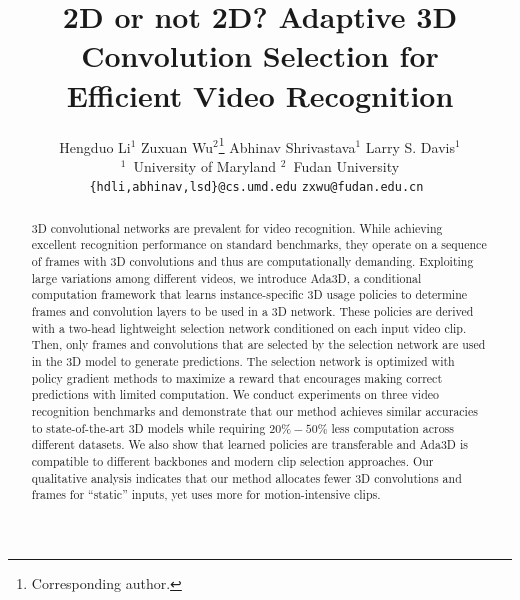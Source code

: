 \documentclass[final]{cvpr}
\begin{document}
\title{2D or not 2D? Adaptive 3D Convolution Selection for \\ Efficient Video Recognition}

\author{Hengduo Li$^{1}$ \qquad Zuxuan Wu$^{2}$\thanks{Corresponding author.} \qquad Abhinav Shrivastava$^{1}$ \qquad Larry S. Davis$^{1}$ \\
$^{1}$~University of Maryland \qquad $^{2}$~Fudan University \\
{\tt\small \{hdli,abhinav,lsd\}@cs.umd.edu} \quad \tt\small zxwu@fudan.edu.cn
}

\maketitle

\thispagestyle{empty}
\pagestyle{empty}

\begin{abstract}
3D convolutional networks are prevalent for video recognition. While achieving excellent recognition performance on standard benchmarks, they operate on a sequence of frames with 3D convolutions and thus are computationally demanding. 
Exploiting large variations among different videos, we introduce Ada3D, a conditional computation framework that learns  instance-specific 3D usage policies to determine frames and convolution layers to be used in a 3D network. These policies are derived with a two-head lightweight selection network conditioned on each input video clip. Then, only frames and convolutions that are selected by the selection network are used in the 3D model to generate predictions. The selection network is optimized with policy gradient methods to maximize a reward that encourages making correct predictions with limited computation. 
We conduct experiments on three video recognition benchmarks and demonstrate that our method achieves similar accuracies to state-of-the-art 3D models while requiring $20\%-50\%$ less computation across different datasets. We also show that learned policies are transferable and Ada3D is compatible to different backbones and modern clip selection approaches. Our qualitative analysis indicates that our method allocates fewer 3D convolutions and frames for ``static'' inputs, yet uses more for motion-intensive clips. 
\end{abstract}
\end{document}
